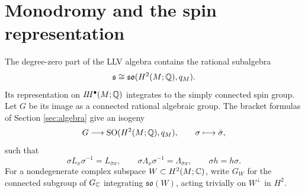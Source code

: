 \section{Monodromy and the spin representation}\label{sec:monodromy}

The degree-zero part of the LLV algebra contains the rational
subalgebra
\[
 \mathfrak s\cong\mathfrak{so}(H^2(M;\mathbb Q),q_M).
\]
Its representation on $I\!H^\bullet(M;\mathbb Q)$ integrates to the
simply connected spin group. Let $G$ be its image as a connected
rational algebraic group. The bracket formulas of Section
\ref{sec:algebra} give an isogeny
\[
 G\longrightarrow\operatorname{SO}(H^2(M;\mathbb Q),q_M),\qquad \sigma\longmapsto\bar\sigma,
\]
such that
\begin{equation}\label{eq:spin-conjugacy}
 \sigma L_x\sigma^{-1}=L_{\bar\sigma x},\qquad
 \sigma\Lambda_x\sigma^{-1}=\Lambda_{\bar\sigma x},\qquad
 \sigma h=h\sigma.
\end{equation}
For a nondegenerate complex subspace $W\subset H^2(M;\mathbb C)$,
write $G_W$ for the connected subgroup of $G_{\mathbb C}$ integrating
$\mathfrak{so}(W)$, acting trivially on $W^\perp$ in $H^2$.

